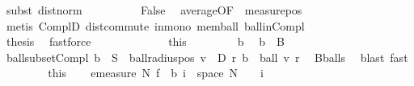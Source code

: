 \begin{isabellebody}
\ {\isacharparenleft}{\kern0pt}subst\ dist{\isacharunderscore}{\kern0pt}norm{\isacharparenright}{\kern0pt}\isanewline
\ \ \ \ \ \ \ \ \isamarkupfalse%
\ {\isachardoublequoteopen}False{\isachardoublequoteclose}\ \isamarkupfalse%
\ average{\isacharbrackleft}{\kern0pt}OF\ {\isacharasterisk}{\kern0pt}\ measure{\isacharunderscore}{\kern0pt}pos{\isacharbrackright}{\kern0pt}\ \isamarkupfalse%
\ {\isacharparenleft}{\kern0pt}metis\ ComplD\ dist{\isacharunderscore}{\kern0pt}commute\ in{\isacharunderscore}{\kern0pt}mono\ mem{\isacharunderscore}{\kern0pt}ball\ ball{\isacharunderscore}{\kern0pt}in{\isacharunderscore}{\kern0pt}Compl{\isacharparenright}{\kern0pt}\isanewline
\ \ \ \ \ \ \isacommand{{\isacharbraceright}{\kern0pt}}\isamarkupfalse%
\isanewline
\ \ \ \ \ \ \isamarkupfalse%
\ {\isacharquery}{\kern0pt}thesis\ \isamarkupfalse%
\ fastforce\isanewline
\ \ \ \ \isamarkupfalse%
\isanewline
\ \ \isacommand{{\isacharbraceright}{\kern0pt}}\isamarkupfalse%
\isanewline
\ \ \isamarkupfalse%
\ {\isacharasterisk}{\kern0pt}\ {\isacharequal}{\kern0pt}\ this\isanewline
\ \ \isacommand{{\isacharbraceleft}{\kern0pt}}\isamarkupfalse%
\isanewline
\ \ \ \ \isamarkupfalse%
\ b{\isacharprime}{\kern0pt}\ \isamarkupfalse%
\ {\isachardoublequoteopen}b{\isacharprime}{\kern0pt}\ {\isasymin}\ B{\isachardoublequoteclose}\isanewline
\ \ \ \ \isamarkupfalse%
\ ball{\isacharunderscore}{\kern0pt}subset{\isacharunderscore}{\kern0pt}Compl{\isacharcolon}{\kern0pt}\ {\isachardoublequoteopen}b{\isacharprime}{\kern0pt}\ {\isasymsubseteq}\ {\isacharminus}{\kern0pt}S{\isachardoublequoteclose}\ \ ball{\isacharunderscore}{\kern0pt}radius{\isacharunderscore}{\kern0pt}pos{\isacharcolon}{\kern0pt}\ {\isachardoublequoteopen}{\isasymexists}v\ {\isasymin}\ D{\isachardot}{\kern0pt}\ {\isasymexists}r{\isachargreater}{\kern0pt}{}{\isachardot}{\kern0pt}\ b{\isacharprime}{\kern0pt}\ {\isacharequal}{\kern0pt}\ ball\ v\ r{\isachardoublequoteclose}\ \isamarkupfalse%
\ B{\isacharunderscore}{\kern0pt}balls\ \isamarkupfalse%
\ {\isacharparenleft}{\kern0pt}blast{\isacharcomma}{\kern0pt}\ fast{\isacharparenright}{\kern0pt}\isanewline
\ \ \isacommand{{\isacharbraceright}{\kern0pt}}\isamarkupfalse%
\isanewline
\ \ \isamarkupfalse%
\ {\isacharasterisk}{\kern0pt}{\isacharasterisk}{\kern0pt}\ {\isacharequal}{\kern0pt}\ this\isanewline
\ \ \isamarkupfalse%
\ {\isachardoublequoteopen}emeasure\ N\ {\isacharparenleft}{\kern0pt}f\ {\isacharminus}{\kern0pt}{\isacharbackquote}{\kern0pt}\ b\ i\ {\isasyminter}\ space\ N{\isacharparenright}{\kern0pt}\ {\isacharequal}{\kern0pt}\ {}{\isachardoublequoteclose}\ \ i\ \isamarkupfalse%

\end{isabellebody}
